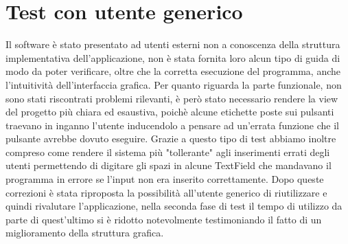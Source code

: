 \documentclass[ 4paper,11pt,openany]{book}
\begin{document}
\section{Test con utente generico}
Il software è stato presentato ad utenti esterni non a conoscenza della struttura implementativa dell'applicazione, non è stata fornita loro alcun tipo di guida di modo da poter verificare, oltre che la corretta esecuzione del programma, anche l'intuitività dell'interfaccia grafica. Per quanto riguarda la parte funzionale, non sono stati riscontrati problemi rilevanti, è però stato necessario rendere la view del progetto più chiara ed esaustiva, poichè alcune etichette poste sui pulsanti traevano in inganno l'utente inducendolo a pensare ad un'errata funzione che il pulsante avrebbe dovuto eseguire. Grazie a questo tipo di test abbiamo inoltre compreso come rendere il sistema più "tollerante" agli inserimenti errati degli utenti permettendo di digitare gli spazi in alcune TextField che mandavano il programma in errore se l'input non era inserito correttamente. Dopo queste correzioni è stata riproposta la possibilità all'utente generico di riutilizzare e quindi rivalutare l'applicazione, nella seconda fase di test il tempo di utilizzo da parte di quest'ultimo si è ridotto notevolmente testimoniando il fatto di un miglioramento della struttura grafica.
\end{document}
